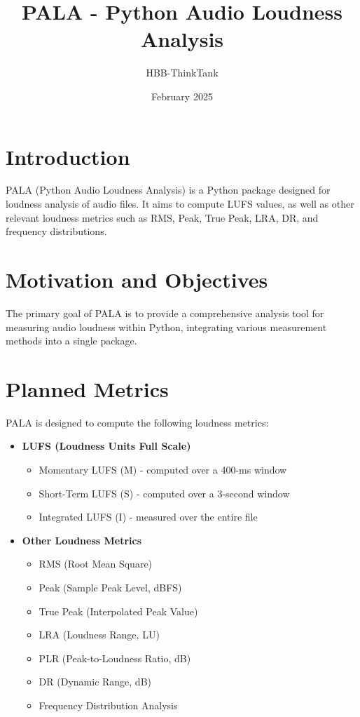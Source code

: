 \documentclass{article}
\title{PALA - Python Audio Loudness Analysis}
\author{HBB-ThinkTank}
\date{February 2025}
\begin{document}
\maketitle

\tableofcontents

\section{Introduction}
PALA (Python Audio Loudness Analysis) is a Python package designed for loudness analysis of audio files. It aims to compute LUFS values, as well as other relevant loudness metrics such as RMS, Peak, True Peak, LRA, DR, and frequency distributions.

\section{Motivation and Objectives}
The primary goal of PALA is to provide a comprehensive analysis tool for measuring audio loudness within Python, integrating various measurement methods into a single package.

\section{Planned Metrics}
PALA is designed to compute the following loudness metrics:
\begin{itemize}
    \item \textbf{LUFS (Loudness Units Full Scale)}
    \begin{itemize}
        \item Momentary LUFS (M) - computed over a 400-ms window
        \item Short-Term LUFS (S) - computed over a 3-second window
        \item Integrated LUFS (I) - measured over the entire file
    \end{itemize}
    \item \textbf{Other Loudness Metrics}
    \begin{itemize}
        \item RMS (Root Mean Square)
        \item Peak (Sample Peak Level, dBFS)
        \item True Peak (Interpolated Peak Value)
        \item LRA (Loudness Range, LU)
        \item PLR (Peak-to-Loudness Ratio, dB)
        \item DR (Dynamic Range, dB)
        \item Frequency Distribution Analysis
    \end{itemize}
\end{itemize}
\end{document}
